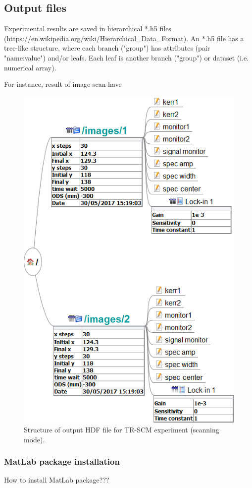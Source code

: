 \documentclass[14pt,a4paper] {article}
\begin{document}
\subsection{Output files}

Experimental results are saved in hierarchical *.h5 files (https://en.wikipedia.org/wiki/Hierarchical_Data_Format). An *.h5 file has a tree-like structure, where each branch ("group") has attributes (pair "name:value") and/or leafs. Each leaf is another branch ("group") or dataset (i.e. numerical array).

For instance, result of image scan have
\begin{figure}
\includegraphics[width = 0.8\linewidth]{HDF5-format.png}
\caption{Structure of output HDF file for TR-SCM experiment (scanning mode).}
\end{figure}



\subsubsection{MatLab package installation}
How to install MatLab package???
\end{document}

